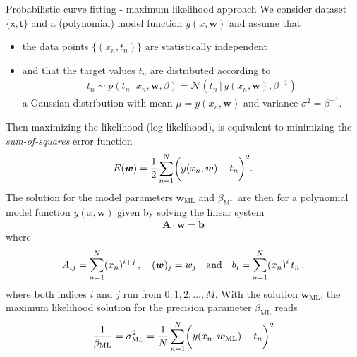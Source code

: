 \documentclass[11pt, DINA4, fleqn]{amsart}
\def\vw{\boldsymbol{w}\xspace}
\def\vb{\boldsymbol{b}\xspace}
\def\mA{\boldsymbol{A}\xspace}
\begin{document}
\begin{mybox_tc3}{Probabilistic curve fitting - maximum likelihood approach}
We consider dataset $\{\boldsymbol{\mathsf{x}}, \boldsymbol{\mathsf{t}}\}$
and a (polynomial) model function $y(x,\bm{w})$ and
assume that
\begin{itemize}
	\item the data points $\{(x_n, t_n)\}$ are statistically independent
	\item and that the target values $t_n$ are distributed according to
	\begin{align}
	t_n  \sim p(t_n \, | \, x_n, \bm{w}, \beta) = \mathcal{N}\left(
	t_n \, \bigl| \, y(x_n,\bm{w}), \beta^{-1}\right) 
	\end{align}
	a Gaussian distribution with mean $\mu = y(x_n, \bm{w})$ and variance $\sigma^2 = \beta^{-1}$.
\end{itemize}
	Then maximizing the likelihood (log likelihood), is equivalent to minimizing the \emph{sum-of-squares} error function
	\begin{align}
	E(\bm{w}) =\dfrac{1}{2} \sum\displaylimits_{n=1}^{N} \biggl(y(x_n, \bm{w}) - t_n\biggl)^2.
	\end{align}
The solution for the model parameters $\bm{w}_{\text{ML}}$ and $\beta_{\text{ML}}$ are then for a polynomial model function $y(x,\bm{w})$ given by
solving the linear system
\begin{align}
\mA \cdot \vw = \vb
\label{eq:linearSystem}
\end{align}
where
\begin{align}
A_{ij} = \sum \displaylimits_{n = 1}^{N} (x_n)^{i + j} \, , \quad
(\vw)_j = w_j \quad \text{and} \quad
b_i = \sum \displaylimits_{n = 1}^{N} (x_n)^{i} \, t_n \, ,
\end{align}
where both indices $i$ and $j$ run from $0, 1, 2, \dotsc, M$.
With the solution $\bm{w}_{\text{ML}}$, the maximum likelihood solution for the precision parameter $\beta_{\text{ML}}$ reads
\begin{align}
\dfrac{1}{\beta_{\text{ML}}} = \sigma^2_{\text{ML}}= \dfrac{1}{N} \sum\displaylimits_{n=1}^{N} \biggl(y(x_n, \bm{w}_{\text{ML}}) - t_n\biggl)^2
\end{align}
\end{mybox_tc3}

\end{document}
